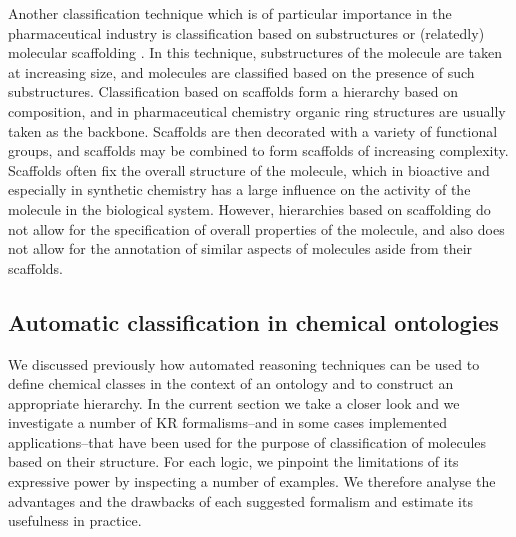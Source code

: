 \documentclass[10pt]{bmc_article}
\newenvironment{bmcformat}{\baselineskip20pt\sloppy\setboolean{publ}{false}}{\baselineskip20pt\sloppy}
\begin{document}
\begin{bmcformat}
Another classification technique which is of particular importance in the pharmaceutical industry is classification based on substructures \cite{deshpande2005} or (relatedly) molecular scaffolding \cite{FindSomething}.  In this technique, substructures of the molecule are taken at increasing size, and molecules are classified based on the presence of such substructures.  Classification based on scaffolds form a hierarchy based on composition, and in pharmaceutical chemistry organic ring structures are usually taken as the backbone.  Scaffolds are then decorated with a variety of functional groups, and scaffolds may be combined to form scaffolds of increasing complexity. 
Scaffolds often fix the overall structure of the molecule, which in bioactive and especially in synthetic chemistry has a large influence on the activity of the molecule in the biological system.  However, hierarchies based on scaffolding do not allow for the specification of overall properties of the molecule, and also does not allow for the annotation of similar aspects of molecules aside from their scaffolds. 



\subsection*{Automatic classification in chemical ontologies}
\label{sec:resultschemontology}

We discussed previously how automated reasoning techniques can be used to define chemical classes in the context of an ontology and to construct an appropriate hierarchy. 
In the current section we take a closer look and we investigate a number of KR formalisms--and in some cases implemented applications--that have been used for the purpose of classification of molecules based on their structure.  For each logic, we pinpoint the limitations of its expressive power by inspecting a number of examples. 
We therefore analyse the advantages and the drawbacks of each suggested formalism and estimate its usefulness in practice.


\end{bmcformat}
\end{document}
